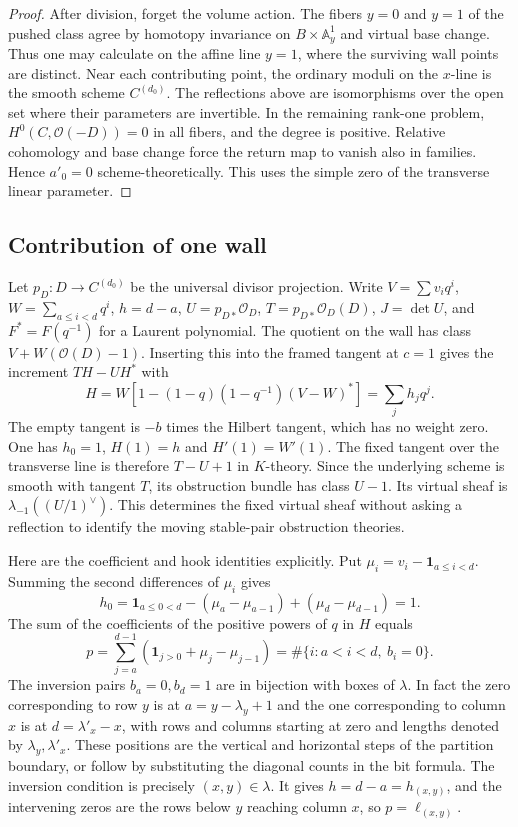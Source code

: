 \begin{proof}
After division, forget the volume action. The fibers $y=0$ and $y=1$ of the pushed class agree by homotopy invariance on $B\times\mathbb A^1_y$ and virtual base change. Thus one may calculate on the affine line $y=1$, where the surviving wall points are distinct. Near each contributing point, the ordinary moduli on the $x$-line is the smooth scheme $C^{(d_0)}$. The reflections above are isomorphisms over the open set where their parameters are invertible. In the remaining rank-one problem, $H^0(C,\mathcal O(-D))=0$ in all fibers, and the degree is positive. Relative cohomology and base change force the return map to vanish also in families. Hence $a'_0=0$ scheme-theoretically. This uses the simple zero of the transverse linear parameter.

\end{proof}

\subsection{Contribution of one wall}

Let $p_D:D\to C^{(d_0)}$ be the universal divisor projection. Write $V=\sum v_iq^i$, $W=\sum_{a\le i<d}q^i$, $h=d-a$, $U=p_{D*}\mathcal O_D$, $T=p_{D*}\mathcal O_D(D)$, $J=\det U$, and $F^*=F(q^{-1})$ for a Laurent polynomial. The quotient on the wall has class $V+W(\mathcal O(D)-1)$. Inserting this into the framed tangent at $c=1$ gives the increment $TH-UH^*$ with
\[
H=W[1-(1-q)(1-q^{-1})(V-W)^*]=\sum_j h_jq^j .
\]
The empty tangent is $-b$ times the Hilbert tangent, which has no weight zero. One has $h_0=1$, $H(1)=h$ and $H'(1)=W'(1)$. The fixed tangent over the transverse line is therefore $T-U+1$ in $K$-theory. Since the underlying scheme is smooth with tangent $T$, its obstruction bundle has class $U-1$. Its virtual sheaf is $\lambda_{-1}((U/1)^\vee)$. This determines the fixed virtual sheaf without asking a reflection to identify the moving stable-pair obstruction theories.

Here are the coefficient and hook identities explicitly. Put $\mu_i=v_i-\mathbf1_{a\le i<d}$. Summing the second differences of $\mu_i$ gives
\[
h_0=\mathbf1_{a\le0<d}-(\mu_a-\mu_{a-1})+(\mu_d-\mu_{d-1})=1 .
\]
The sum of the coefficients of the positive powers of $q$ in $H$ equals
\[
p=\sum_{j=a}^{d-1}(\mathbf1_{j>0}+\mu_j-\mu_{j-1})
=\#\{i:a<i<d,\ b_i=0\}.
\]
The inversion pairs $b_a=0,b_d=1$ are in bijection with boxes of $\lambda$. In fact the zero corresponding to row $y$ is at $a=y-\lambda_y+1$ and the one corresponding to column $x$ is at $d=\lambda'_x-x$, with rows and columns starting at zero and lengths denoted by $\lambda_y,\lambda'_x$. These positions are the vertical and horizontal steps of the partition boundary, or follow by substituting the diagonal counts in the bit formula. The inversion condition is precisely $(x,y)\in\lambda$. It gives $h=d-a=h_{(x,y)}$, and the intervening zeros are the rows below $y$ reaching column $x$, so $p=\ell_{(x,y)}$.

